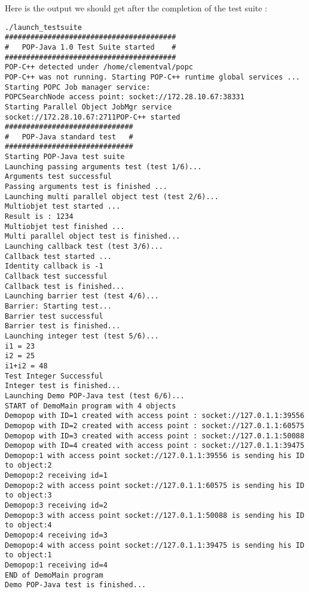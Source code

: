 Here is the output we should get after the completion of the test suite : 
\begin{lstlisting}[basicstyle=\ttfamily\scriptsize]
./launch_testsuite 
########################################
#   POP-Java 1.0 Test Suite started    #
########################################
POP-C++ detected under /home/clementval/popc
POP-C++ was not running. Starting POP-C++ runtime global services ...
Starting POPC Job manager service: 
POPCSearchNode access point: socket://172.28.10.67:38331
Starting Parallel Object JobMgr service 
socket://172.28.10.67:2711POP-C++ started
##############################
#   POP-Java standard test   #
##############################
Starting POP-Java test suite
Launching passing arguments test (test 1/6)... 
Arguments test successful
Passing arguments test is finished ... 
Launching multi parallel object test (test 2/6)... 
Multiobjet test started ...
Result is : 1234
Multiobjet test finished ...
Multi parallel object test is finished... 
Launching callback test (test 3/6)... 
Callback test started ...
Identity callback is -1
Callback test successful
Callback test is finished... 
Launching barrier test (test 4/6)... 
Barrier: Starting test...
Barrier test successful
Barrier test is finished... 
Launching integer test (test 5/6)... 
i1 = 23
i2 = 25
i1+i2 = 48
Test Integer Successful
Integer test is finished... 
Launching Demo POP-Java test (test 6/6)... 
START of DemoMain program with 4 objects
Demopop with ID=1 created with access point : socket://127.0.1.1:39556
Demopop with ID=2 created with access point : socket://127.0.1.1:60575
Demopop with ID=3 created with access point : socket://127.0.1.1:50088
Demopop with ID=4 created with access point : socket://127.0.1.1:39475
Demopop:1 with access point socket://127.0.1.1:39556 is sending his ID to object:2
Demopop:2 receiving id=1
Demopop:2 with access point socket://127.0.1.1:60575 is sending his ID to object:3
Demopop:3 receiving id=2
Demopop:3 with access point socket://127.0.1.1:50088 is sending his ID to object:4
Demopop:4 receiving id=3
Demopop:4 with access point socket://127.0.1.1:39475 is sending his ID to object:1
Demopop:1 receiving id=4
END of DemoMain program
Demo POP-Java test is finished... 


\end{lstlisting}
